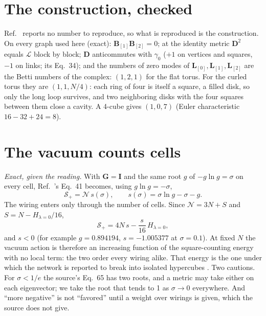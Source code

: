 \documentclass[pre,twocolumn,superscriptaddress,nofootinbib]{revtex4-2}
\begin{document}
\section{The construction, checked}

Ref.~\cite{Bia24} reports no number to reproduce, so what is reproduced is the construction. On every graph used
here (exact): $\mathbf{B}_{[1]}\mathbf{B}_{[2]}=0$; at the identity metric $\mathbf{D}^2$ equals
$\boldsymbol{\mathcal{L}}$ block by block; $\mathbf{D}$ anticommutes with $\gamma_0$ ($+1$ on vertices and squares,
$-1$ on links; its Eq.~34); and the numbers of zero modes of $\mathbf{L}_{[0]},\mathbf{L}_{[1]},\mathbf{L}_{[2]}$
are the Betti numbers of the complex: $(1,2,1)$ for the flat torus. For the curled torus they are $(1,1,N/4)$: each
ring of four is itself a square, a filled disk, so only the long loop survives, and two neighboring disks with the
four squares between them close a cavity. A 4-cube gives $(1,0,7)$ (Euler characteristic $16-32+24=8$).

\section{The vacuum counts cells}

\emph{Exact, given the reading.} With $\mathbf{G}=\mathbf{I}$ and the same root $g$ of $-g\ln g=\sigma$ on every
cell, Ref.~\cite{Bia24}'s Eq.~41 becomes, using $g\ln g=-\sigma$,
\begin{equation}
\mathcal{S}_{+}=\mathcal{N}\,s(\sigma),\qquad s(\sigma)=\sigma\ln g-\sigma-g .
\label{eq:vac}
\end{equation}
The wiring enters only through the number of cells. Since $\mathcal{N}=3N+S$ and $S=N-H_{\lambda=0}/16$,
\begin{equation}
\mathcal{S}_{+}=4N\,s-\frac{s}{16}\,H_{\lambda=0},
\end{equation}
and $s<0$ (for example $g=0.894194$, $s=-1.005377$ at $\sigma=0.1$). At fixed $N$ the vacuum action is therefore an
increasing function of the square-counting energy with no local term: the two order every wiring alike. That energy
is the one under which the network is reported to break into isolated hypercubes \cite{KTB19,T25}. Two cautions. For
$\sigma<1/e$ the source's Eq.~65 has two roots, and a metric may take either on each eigenvector; we take the root
that tends to 1 as $\sigma\to0$ everywhere. And ``more negative'' is not ``favored'' until a weight over wirings is
given, which the source does not give.
\end{document}

